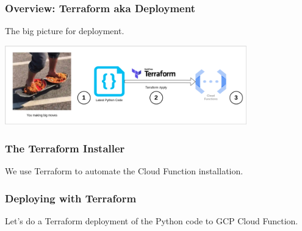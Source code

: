 \documentclass[aspectratio=169]{beamer}
\begin{document}

\begin{frame}
	\frametitle{Overview: Terraform aka Deployment}
	The big picture for deployment.
	\vspace{5mm}
	
	\includegraphics[width=0.785\textwidth]{../images/arch_diagrams-deployment.png}
\end{frame}

\begin{frame}
	\frametitle{The Terraform Installer}
	We use Terraform to automate the Cloud Function installation.
\end{frame}

\begin{frame}
	\frametitle{Deploying with Terraform}
	Let's do a Terraform deployment of the Python code to GCP Cloud Function.
\end{frame}
\end{document}
